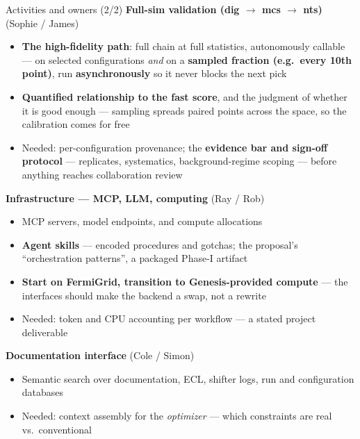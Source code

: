 \documentclass[aspectratio=169,10pt]{beamer}
\begin{document}
\begin{frame}{Activities and owners (2/2)}
\footnotesize
\textbf{Full-sim validation (dig $\rightarrow$ mcs $\rightarrow$ nts)} \hfill \textcolor{fnalblue}{(Sophie / James)}
\begin{itemize}\tiny
  \item \textbf{The high-fidelity path}: full chain at full statistics, autonomously callable --- on selected configurations \emph{and} on a \textbf{sampled fraction (e.g.\ every 10th point)}, run \textbf{asynchronously} so it never blocks the next pick
  \item \textbf{Quantified relationship to the fast score}, and the judgment of whether it is good enough --- sampling spreads paired points across the space, so the calibration comes for free
  \item Needed: per-configuration provenance; the \textbf{evidence bar and sign-off protocol} --- replicates, systematics, background-regime scoping --- before anything reaches collaboration review
\end{itemize}
\vspace{0.15em}

\textbf{Infrastructure --- MCP, LLM, computing} \hfill \textcolor{fnalblue}{(Ray / Rob)}
\begin{itemize}\tiny
  \item MCP servers, model endpoints, and compute allocations
  \item \textbf{Agent skills} --- encoded procedures and gotchas; the proposal's ``orchestration patterns'', a packaged Phase-I artifact
  \item \textbf{Start on FermiGrid, transition to Genesis-provided compute} --- the interfaces should make the backend a swap, not a rewrite
  \item Needed: token and CPU accounting per workflow --- a stated project deliverable
\end{itemize}
\vspace{0.15em}

\textbf{Documentation interface} \hfill \textcolor{fnalblue}{(Cole / Simon)}
\begin{itemize}\tiny
  \item Semantic search over documentation, ECL, shifter logs, run and configuration databases
  \item Needed: context assembly for the \emph{optimizer} --- which constraints are real vs.\ conventional
\end{itemize}
\vspace{0.15em}


\end{frame}
\end{document}
